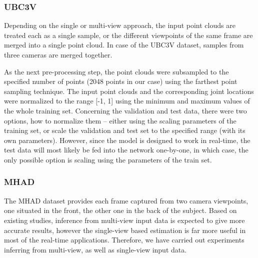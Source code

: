 \subsubsection{UBC3V}

Depending on the single or multi-view approach, the input point clouds are treated each as a single sample, or the different viewpoints of the same frame are merged into a single point cloud. In case of the UBC3V dataset, samples from three cameras are merged together. %
\par
\vspace{5mm}
\noindent
As the next pre-processing step, the point clouds were subsampled to the specified number of points (2048 points in our case) using the farthest point sampling technique. The input point clouds and the corresponding joint locations were normalized to the range [-1, 1] using the minimum and maximum values of the whole training set. Concerning the validation and test data, there were two options, how to normalize them – either using the scaling parameters of the training set, or scale the validation and test set to the specified range (with its own parameters). However, since the model is designed to work in real-time, the test data will most likely be fed into the network one-by-one, in which case, the only possible option is scaling using the parameters of the train set.\par

\subsubsection{MHAD}
The MHAD dataset provides each frame captured from two camera viewpoints, one situated in the front, the other one in the back of the subject.
Based on existing studies, inference from multi-view input data is expected to give more accurate results, however the single-view based estimation is far more useful in most of the real-time applications. Therefore, we have carried out experiments inferring from multi-view, as well as single-view input data.\par
\vspace{5mm}

